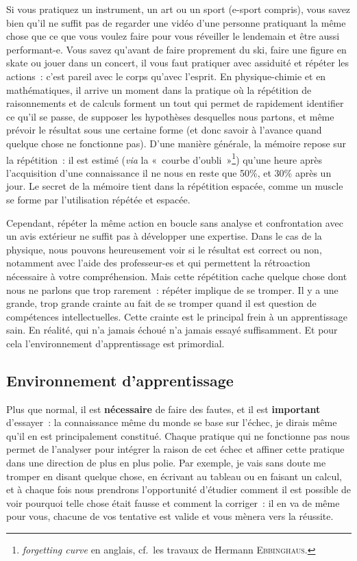 \documentclass[a4paper, 12pt, garamond]{book}
\begin{document}
Si vous pratiquez un instrument, un art ou un sport (e-sport compris), vous
savez bien qu'il ne suffit pas de regarder une vidéo d'une personne pratiquant
la même chose que ce que vous voulez faire pour vous réveiller le lendemain et
être aussi performant-e. Vous savez qu'avant de faire proprement du ski, faire
une figure en skate ou jouer dans un concert, il vous faut pratiquer avec
assiduité et répéter les actions~: c'est pareil avec le corps qu'avec l'esprit.
En physique-chimie et en mathématiques, il arrive un moment dans la pratique où
la répétition de raisonnements et de calculs forment un tout qui permet de
rapidement identifier ce qu'il se passe, de supposer les hypothèses desquelles
nous partons, et même prévoir le résultat sous une certaine forme (et donc
savoir à l'avance quand quelque chose ne fonctionne pas). D'une manière
générale, la mémoire repose sur la répétition~: il est estimé (\textit{via} la
«~courbe d'oubli~»\footnote{\textit{forgetting curve} en anglais, cf.\ les
	travaux de Hermann \textsc{Ebbinghaus}.}) qu'une heure après l'acquisition
d'une connaissance il ne nous en reste que 50\%, et 30\% après un jour. Le
secret de la mémoire tient dans la répétition espacée, comme un muscle se forme
par l'utilisation répétée et espacée.

Cependant, répéter la même action en boucle sans analyse et confrontation avec
un avis extérieur ne suffit pas à développer une expertise. Dans le cas de la
physique, nous pouvons heureusement voir si le résultat est correct ou non,
notamment avec l'aide des professeur-es et qui permettent la rétroaction
nécessaire à votre compréhension. Mais cette répétition cache quelque chose dont
nous ne parlons que trop rarement~: répéter implique de se tromper. Il y a une
grande, trop grande crainte au fait de se tromper quand il est question de
compétences intellectuelles. Cette crainte est le principal frein à un
apprentissage sain. En réalité, qui n'a jamais échoué n'a jamais essayé
suffisamment. Et pour cela l'environnement d'apprentissage est primordial.

\subsection{Environnement d'apprentissage}

Plus que normal, il est \textbf{nécessaire} de faire des fautes, et il est
\textbf{important} d'essayer~: la connaissance même du monde se base sur
l'échec, je dirais même qu'il en est principalement constitué. Chaque pratique
qui ne fonctionne pas nous permet de l'analyser pour intégrer la raison de cet
échec et affiner cette pratique dans une direction de plus en plus polie. Par
exemple, je vais sans doute me tromper en disant quelque chose, en écrivant au
tableau ou en faisant un calcul, et à chaque fois nous prendrons l'opportunité
d'étudier comment il est possible de voir pourquoi telle chose était fausse et
comment la corriger~: il en va de même pour vous, chacune de vos tentative est
valide et vous mènera vers la réussite.
\end{document}
